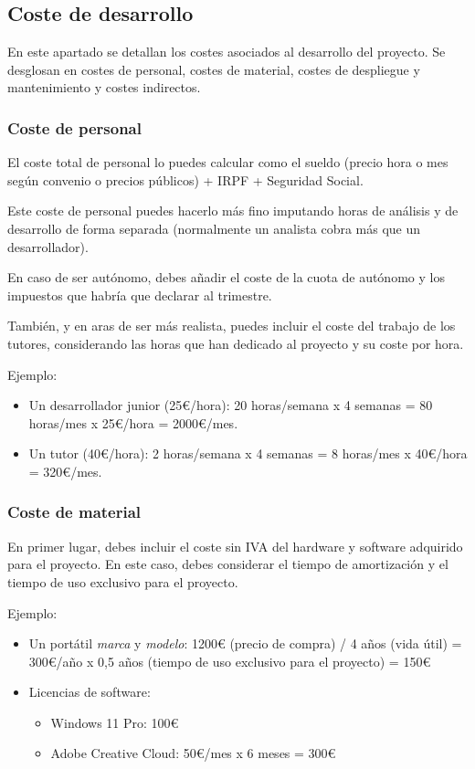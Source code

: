 \subsection{Coste de desarrollo}

En este apartado se detallan los costes asociados al desarrollo del proyecto. Se desglosan en costes de personal, costes de material, costes de despliegue y mantenimiento y costes indirectos.

\subsubsection{Coste de personal}

El coste total de personal lo puedes calcular como el sueldo (precio hora o mes según convenio o precios públicos) + IRPF + Seguridad Social.

Este coste de personal puedes hacerlo más fino imputando horas de análisis y de desarrollo de forma separada (normalmente un analista cobra más que un desarrollador).

En caso de ser autónomo, debes añadir el coste de la cuota de autónomo y los impuestos que habría que declarar al trimestre.

También, y en aras de ser más realista, puedes incluir el coste del trabajo de los tutores, considerando las horas que han dedicado al proyecto y su coste por hora. 

Ejemplo:
\begin{itemize}
\item Un desarrollador junior (25€/hora): 20 horas/semana x 4 semanas = 80 horas/mes x 25€/hora = 2000€/mes.
\item Un tutor (40€/hora): 2 horas/semana x 4 semanas = 8 horas/mes x 40€/hora = 320€/mes.
\end{itemize}

\subsubsection{Coste de material}

En primer lugar, debes incluir el coste sin IVA del hardware y software adquirido para el proyecto. En este caso, debes considerar el tiempo de amortización y el tiempo de uso exclusivo para el proyecto.

Ejemplo:

\begin{itemize}
  
\item Un portátil \textit{marca} y \textit{modelo}: 1200€ (precio de compra) / 4 años (vida útil) = 300€/año x 0,5 años (tiempo de uso exclusivo para el proyecto) = 150€

\item Licencias de software: 
    \begin{itemize}
    \item Windows 11 Pro: 100€
    \item Adobe Creative Cloud: 50€/mes x 6 meses = 300€
    \end{itemize}
\end{itemize}


